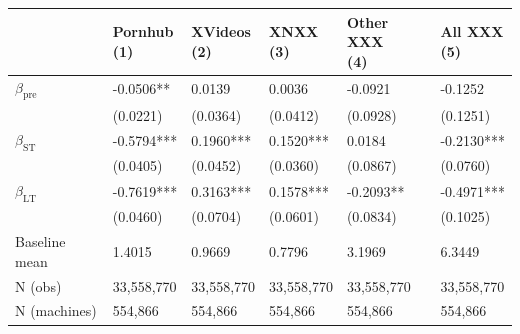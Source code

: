 \begin{tabular}[t]{llllll}
\toprule
  & \shortstack{Pornhub\\(1)} & \shortstack{XVideos\\(2)} & \shortstack{XNXX\\(3)} & \shortstack{Other XXX\\(4)} & \shortstack{All XXX\\(5)}\\
\midrule
$\beta_{\mathrm{pre}}$ & -0.0506** & 0.0139 & 0.0036 & -0.0921 & -0.1252\\
 & (0.0221) & (0.0364) & (0.0412) & (0.0928) & (0.1251)\\
$\beta_{\mathrm{ST}}$ & -0.5794*** & 0.1960*** & 0.1520*** & 0.0184 & -0.2130***\\
 & (0.0405) & (0.0452) & (0.0360) & (0.0867) & (0.0760)\\
$\beta_{\mathrm{LT}}$ & -0.7619*** & 0.3163*** & 0.1578*** & -0.2093** & -0.4971***\\
 & (0.0460) & (0.0704) & (0.0601) & (0.0834) & (0.1025)\\
\addlinespace
Baseline mean & 1.4015 & 0.9669 & 0.7796 & 3.1969 & 6.3449\\
N (obs) & 33,558,770 & 33,558,770 & 33,558,770 & 33,558,770 & 33,558,770\\
N (machines) & 554,866 & 554,866 & 554,866 & 554,866 & 554,866\\
\bottomrule
\end{tabular}
